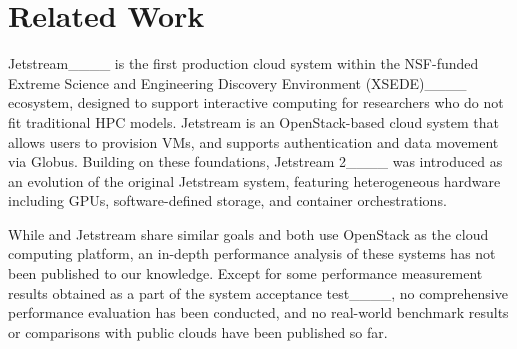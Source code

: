 \section{Related Work}
Jetstream____ is the first production cloud system within the NSF-funded Extreme
Science and Engineering Discovery Environment (XSEDE)____ ecosystem, designed to
support interactive computing for researchers who do not fit traditional HPC models. Jetstream is an
OpenStack-based cloud system that allows users to provision VMs, and supports authentication and
data movement via Globus. Building on these foundations, Jetstream 2____ was
introduced as an evolution of the original Jetstream system, featuring heterogeneous hardware
including GPUs, software-defined storage, and container orchestrations.

While \mdx{} and Jetstream share similar goals and both use OpenStack as the cloud computing
platform, an in-depth performance analysis of these systems has not been published to our knowledge.
Except for some performance measurement results obtained as a part of the system acceptance
test____, no comprehensive performance evaluation has been conducted, and no
real-world benchmark results or comparisons with public clouds have been published so far.